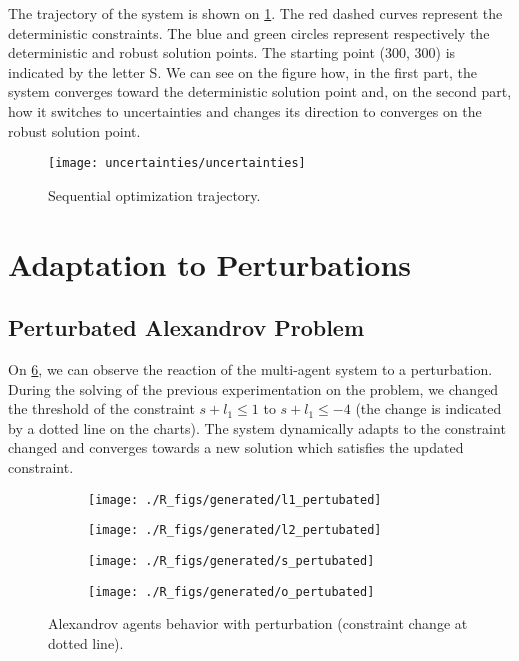 The trajectory of the system is shown on \figurename{} \ref{sequential_optim_fig}. The red dashed curves represent the deterministic constraints. The blue and green circles represent respectively the deterministic and robust solution points. The starting point (300, 300) is indicated by the letter S. We can see on the figure how, in the first part, the system converges toward the deterministic solution point and, on the second part, how it switches to uncertainties and changes its direction to converges on the robust solution point.

\begin{figure}
\centering
\texttt{[image: uncertainties/uncertainties]}
\caption{Sequential optimization trajectory.}\label{sequential_optim_fig}
\end{figure}

\section{Adaptation to Perturbations}

\subsection{Perturbated Alexandrov Problem}
 
On \figurename{} \ref{alexandrov_res_pert}, we can observe the reaction of the multi-agent system to a perturbation. During the solving of the previous experimentation on the problem, we changed the threshold of the constraint $s + l_1 \leq 1$ to $s + l_1 \leq -4$ (the change is indicated by a dotted line on the charts). The system dynamically adapts to the constraint changed and converges towards a new solution which satisfies the updated constraint.

\begin{figure}[]
\centering
	\begin{subfigure}[b]{0.4\textwidth}
		\centering
		\texttt{[image: ./R\_figs/generated/l1\_pertubated]}
		\label{alexandrov_res_pert:l1}
	\end{subfigure}
	\begin{subfigure}[b]{0.4\textwidth}
		\centering
		\texttt{[image: ./R\_figs/generated/l2\_pertubated]}
		\label{alexandrov_res_pert:l2}
	\end{subfigure}

	\begin{subfigure}[b]{0.4\textwidth}
		\centering
		\texttt{[image: ./R\_figs/generated/s\_pertubated]}
		\label{alexandrov_res_pert:s}
	\end{subfigure}
	\begin{subfigure}[b]{0.4\textwidth}
		\centering
		\texttt{[image: ./R\_figs/generated/o\_pertubated]}
		\label{alexandrov_res_pert:o}
	\end{subfigure}
	
	\caption{Alexandrov agents behavior with perturbation (constraint change at dotted line).}
	\label{alexandrov_res_pert}
	
\end{figure}

